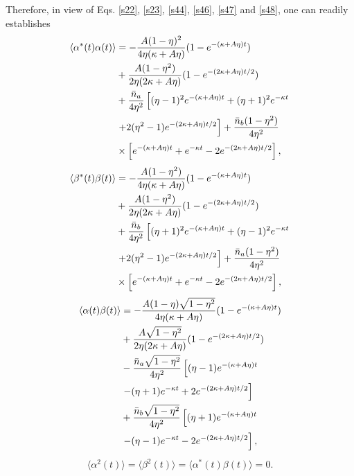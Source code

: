 \documentclass[twocolumn,showpacs,preprintnumbers,amsmath,amssymb,pra]{revtex4}
\begin{document}
Therefore, in view of Eqs.
\eqref{s22}, \eqref{s23}, \eqref{s44}, \eqref{s46}, \eqref{s47} and \eqref{s48}, one can readily establishes 
\begin{align}\label{s49}\langle\alpha^{*}(t)\alpha(t)\rangle &=-{A(1-\eta)^{2}\over4\eta(\kappa+A\eta)}(1-e^{-(\kappa+A\eta)t})\notag\\&+{A(1-\eta^{2})\over2\eta(2\kappa+A\eta)}(1-e^{-(2\kappa+A\eta)t/2})
\notag\\&+{\bar{n}_{a}\over4\eta^{2}}\left[(\eta-1)^{2}e^{-(\kappa+A\eta)t}+(\eta+1)^{2}e^{-\kappa t}\right.\notag\\&\left.+2(\eta^{2}-1)e^{-(2\kappa+A\eta)t/2}\right]+{\bar{n}_{b}(1-\eta^{2})\over4\eta^{2}}\notag\\&\times\left[e^{-(\kappa+A\eta)t}+e^{-\kappa t}-2e^{-(2\kappa+A\eta)t/2}\right],\end{align}
\begin{align}\label{s50}\langle\beta^{*}(t)\beta(t)\rangle& = -{A(1-\eta^{2})\over4\eta(\kappa+A\eta)}(1-e^{-(\kappa+A\eta)t})\notag\\&+{A(1-\eta^{2})\over2\eta(2\kappa+A\eta)}(1-e^{-(2\kappa+A\eta)t/2})\notag\\&+{\bar{n}_{b}\over4\eta^{2}}\left[(\eta+1)^{2}e^{-(\kappa+A\eta)t}+(\eta-1)^{2}e^{-\kappa t}\right.\notag\\&\left.+2(\eta^{2}-1)e^{-(2\kappa+A\eta)t/2}\right]+{\bar{n}_{a}(1-\eta^{2})\over4\eta^{2}}\notag\\&\times\left[e^{-(\kappa+A\eta)t}+e^{-\kappa t}-2e^{-(2\kappa+A\eta)t/2}\right],\end{align}
\begin{align}\label{s51}\langle\alpha(t)\beta(t)\rangle &=
-{A(1-\eta)\sqrt{1-\eta^{2}}\over4\eta(\kappa+A\eta)}(1-e^{-(\kappa+A\eta)t})\notag\\&+{A\sqrt{1-\eta^{2}}\over2\eta(2\kappa+A\eta)}(1-e^{-(2\kappa+A\eta)t/2})\notag\\&-{\bar{n}_{a}\sqrt{1-\eta^{2}}\over4\eta^{2}}\left[(\eta-1)e^{-(\kappa+A\eta)t}\right.\notag\\&\left.-(\eta+1)e^{-\kappa t}+2e^{-(2\kappa+A\eta)t/2}\right]\notag\\&+{\bar{n}_{b}\sqrt{1-\eta^{2}}\over4\eta^{2}}\left[(\eta+1)e^{-(\kappa+A\eta)t}\right.\notag\\&\left.-(\eta-1)e^{-\kappa t}-2e^{-(2\kappa+A\eta)t/2}\right],\end{align}
\begin{align}\label{s52}\langle\alpha^{2}(t)\rangle=\langle\beta^{2}(t)\rangle=\langle\alpha^{*}(t)\beta(t)\rangle=0.\end{align}
\end{document}
